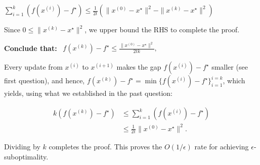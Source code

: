 \documentclass{article}
\theoremstyle{remark}
\theoremstyle{definition}
\begin{document}
$
\sum_{i=1}^k ( f(x^{(i)}) - f^\star ) \leq
\frac{1}{2t} (\|x^{(0)} - x^\star\|^2 - \|x^{(k)} - x^\star\|^2  )
$

Since $ 0 \leq \|x^{(k)} - x^\star\|^2 $, we upper bound the RHS to complete the proof.



\begin{tcolorbox}
\textbf{Conclude that:}
$
\,\,\, f(x^{(k)}) - f^\star \leq \frac{\|x^{(0)} - x^\star\|^2}{2tk}, 
$
\end{tcolorbox}

Every update from $x^{(i)}$ to $x^{(i+1)}$ makes the gap $f(x^{(i)}) - f^\star$ smaller (see first question), and hence, $f(x^{(k)}) - f^\star = \min \{f(x^{(i)}) - f^\star\}_{i=1}^{i=k}$, which yields, using what we established in the past question: 

\begin{align*}
k(f(x^{(k)}) - f^\star) &\leq \sum_{i=1}^k ( f(x^{(i)})-f^\star ) \\
&\leq \frac{1}{2t} \|x^{(0)} - x^\star\|^2. 
\end{align*}

Dividing by $k$ completes the proof. This proves the $O(1/\epsilon)$ rate for achieving $\epsilon$-suboptimality.  
\end{document}

